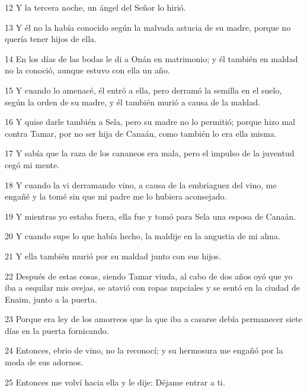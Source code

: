 \par 12 Y la tercera noche, un ángel del Señor lo hirió.

\par 13 Y él no la había conocido según la malvada astucia de su madre, porque no quería tener hijos de ella.

\par 14 En los días de las bodas le di a Onán en matrimonio; y él también en maldad no la conoció, aunque estuvo con ella un año.

\par 15 Y cuando lo amenacé, él entró a ella, pero derramó la semilla en el suelo, según la orden de su madre, y él también murió a causa de la maldad.

\par 16 Y quise darle también a Sela, pero su madre no lo permitió; porque hizo mal contra Tamar, por no ser hija de Canaán, como también lo era ella misma.

\par 17 Y sabía que la raza de los cananeos era mala, pero el impulso de la juventud cegó mi mente.

\par 18 Y cuando la vi derramando vino, a causa de la embriaguez del vino, me engañé y la tomé sin que mi padre me lo hubiera aconsejado.

\par 19 Y mientras yo estaba fuera, ella fue y tomó para Sela una esposa de Canaán.

\par 20 Y cuando supe lo que había hecho, la maldije en la angustia de mi alma.

\par 21 Y ella también murió por su maldad junto con sus hijos.

\par 22 Después de estas cosas, siendo Tamar viuda, al cabo de dos años oyó que yo iba a esquilar mis ovejas, se atavió con ropas nupciales y se sentó en la ciudad de Enaim, junto a la puerta.

\par 23 Porque era ley de los amorreos que la que iba a casarse debía permanecer siete días en la puerta fornicando.

\par 24 Entonces, ebrio de vino, no la reconocí; y su hermosura me engañó por la moda de sus adornos.

\par 25 Entonces me volví hacia ella y le dije: Déjame entrar a ti.

